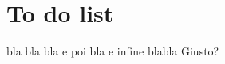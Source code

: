 \documentclass[10pt,a4paper]{article}
\begin{document}
\section{To do list}
bla bla bla
e poi bla
e infine blabla
Giusto?
\end{document}
